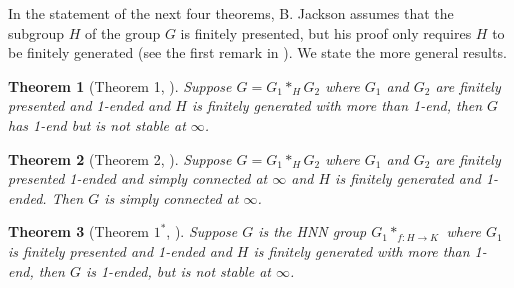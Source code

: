 \documentclass[12pt]{article}
\newtheorem{theorem}{Theorem}[subsection]
\newenvironment{proof}{\addvspace{12pt}\noindent{\bf Proof:}}{
$\Box$\par\addvspace{12pt}}
\begin{document}

In the statement of the next four theorems, B. Jackson assumes that the subgroup $H$ of the group $G$ is finitely presented, but his proof only requires $H$ to be finitely generated (see the first remark in \cite{J82b}). We state the more general results. 

\begin{theorem} [Theorem 1, \cite{J82b}]  \label{JackI} 
Suppose $G=G_1\ast_HG_2$ where $G_1$ and $G_2$ are finitely presented and 1-ended and $H$ is finitely generated with more than 1-end, then $G$ has 1-end but is not stable at $\infty$. 
\end{theorem}

\begin{theorem} [Theorem 2, \cite{J82b}] \label{JackIi}
Suppose $G=G_1\ast_HG_2$ where $G_1$ and $G_2$ are finitely presented 1-ended and simply connected at $\infty$ and $H$ is finitely generated and 1-ended. Then $G$ is simply connected at $\infty$.
\end{theorem} 

\begin{theorem} [Theorem $1^\ast$, \cite{J82b}] \label{JackII} 
Suppose $G$ is the HNN group $G_1 \ast _{f:H\to K}$ where $G_1$ is finitely presented and 1-ended and $H$ is finitely generated with more than 1-end, then $G$ is 1-ended, but is not stable at $\infty$. 
\end{theorem}
\end{document}
